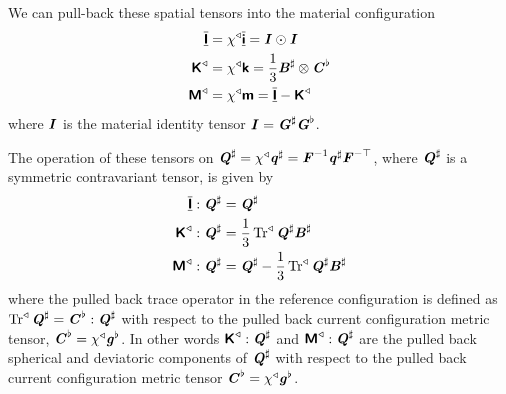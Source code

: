 We can pull-back these spatial tensors into the material configuration \ie
\begin{align}
    \overline{\underline{\boldsymbol{\mathsf{ I }}}}  &= \chi^{\triangleleft}  \overline{\underline{\boldsymbol{\mathsf{ i }}}}   =   \boldsymbol{\mathit{ I }}   \odot   \boldsymbol{\mathit{ I }}   
  \\
     \boldsymbol{\mathsf{ K }}  ^{\triangleleft} &= \chi^{\triangleleft}  \boldsymbol{\mathsf{ k }}   =\dfrac{1}{3}  \boldsymbol{\mathit{B}}^{\sharp}  \otimes \boldsymbol{\mathit{C}}^{\flat} \\
     \boldsymbol{\mathsf{ M }}  ^{\triangleleft} &= \chi^{\triangleleft}  \boldsymbol{\mathsf{ m }}  =  \overline{\underline{\boldsymbol{\mathsf{ I }}}}  -   \boldsymbol{\mathsf{ K }}  ^{\triangleleft}\end {align}
where $  \boldsymbol{\mathit{ I }}  $ is the material identity tensor \ie
$  \boldsymbol{\mathit{ I }}  = \boldsymbol{\mathit{G}}^{\sharp} \boldsymbol{\mathit{G}}^{\flat}$.

The operation of these tensors on
$ \boldsymbol{\mathit{Q}}^{\sharp} = \chi^{\triangleleft} \boldsymbol{\mathit{q}}^{\sharp}  ={\boldsymbol{\mathit{F}}}^{-1} \boldsymbol{\mathit{q}}^{\sharp}  {\boldsymbol{\mathit{F}}}^{- \top } $,
where $ \boldsymbol{\mathit{Q}}^{\sharp} $ is a symmetric contravariant tensor, is given by
\begin{align}
     \overline{\underline{\boldsymbol{\mathsf{ I }}}}   :  \boldsymbol{\mathit{Q}}^{\sharp}  &= \boldsymbol{\mathit{Q}}^{\sharp}  \\
      \boldsymbol{\mathsf{ K }}  ^{\triangleleft}  :  \boldsymbol{\mathit{Q}}^{\sharp}  &=\dfrac{1}{3} \operatorname{Tr}^{\triangleleft}  \boldsymbol{\mathit{Q}}^{\sharp}  \boldsymbol{\mathit{B}}^{\sharp}  \\
      \boldsymbol{\mathsf{ M }}  ^{\triangleleft}  :  \boldsymbol{\mathit{Q}}^{\sharp}  &= \boldsymbol{\mathit{Q}}^{\sharp} -\dfrac{1}{3} \operatorname{Tr}^{\triangleleft}  \boldsymbol{\mathit{Q}}^{\sharp}  \boldsymbol{\mathit{B}}^{\sharp} 
\end{align}
where the pulled back trace operator in the reference configuration is defined
as
$ \operatorname{Tr}^{\triangleleft}  \boldsymbol{\mathit{Q}}^{\sharp} = \boldsymbol{\mathit{C}}^{\flat} :  \boldsymbol{\mathit{Q}}^{\sharp}  $
\ie with respect to the pulled back current configuration metric tensor,
$\boldsymbol{\mathit{C}}^{\flat}= \chi^{\triangleleft}\boldsymbol{\mathit{g}}^{\flat} $. In other words
$    \boldsymbol{\mathsf{ K }}  ^{\triangleleft}  :  \boldsymbol{\mathit{Q}}^{\sharp}  $ and
$    \boldsymbol{\mathsf{ M }}  ^{\triangleleft}  :  \boldsymbol{\mathit{Q}}^{\sharp}  $ are the pulled
back spherical and deviatoric components of $ \boldsymbol{\mathit{Q}}^{\sharp} $ with respect to the
pulled back current configuration metric tensor $\boldsymbol{\mathit{C}}^{\flat}= \chi^{\triangleleft}\boldsymbol{\mathit{g}}^{\flat} $.

